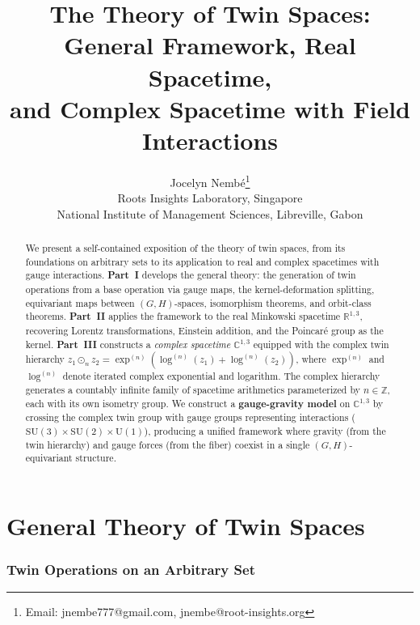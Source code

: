 \documentclass[12pt]{article}
\title{\textbf{The Theory of Twin Spaces:\\General Framework, Real Spacetime,\\and Complex Spacetime with Field Interactions}}
\author{Jocelyn Nemb\'e\thanks{Email: jnembe777@gmail.com, jnembe@root-insights.org}\\[0.3em]
\small Roots Insights Laboratory, Singapore\\
\small National Institute of Management Sciences, Libreville, Gabon}
\date{}
\theoremstyle{plain}
\theoremstyle{definition}
\theoremstyle{remark}
\newcommand{\SU}{\mathrm{SU}}
\newcommand{\UU}{\mathrm{U}}
\newcommand{\CC}{\mathbb{C}}
\newcommand{\RR}{\mathbb{R}}
\newcommand{\ZZ}{\mathbb{Z}}
\begin{document}
\maketitle

\begin{abstract}
We present a self-contained exposition of the theory of twin spaces, from its foundations on arbitrary sets to its application to real and complex spacetimes with gauge interactions. \textbf{Part~I} develops the general theory: the generation of twin operations from a base operation via gauge maps, the kernel-deformation splitting, equivariant maps between $(G,H)$-spaces, isomorphism theorems, and orbit-class theorems. \textbf{Part~II} applies the framework to the real Minkowski spacetime $\RR^{1,3}$, recovering Lorentz transformations, Einstein addition, and the Poincar\'e group as the kernel. \textbf{Part~III} constructs a \emph{complex spacetime} $\CC^{1,3}$ equipped with the complex twin hierarchy $z_1 \odot_n z_2 = \exp^{(n)}(\log^{(n)}(z_1) + \log^{(n)}(z_2))$, where $\exp^{(n)}$ and $\log^{(n)}$ denote iterated complex exponential and logarithm. The complex hierarchy generates a countably infinite family of spacetime arithmetics parameterized by $n \in \ZZ$, each with its own isometry group. We construct a \textbf{gauge-gravity model} on $\CC^{1,3}$ by crossing the complex twin group with gauge groups representing interactions ($\SU(3) \times \SU(2) \times \UU(1)$), producing a unified framework where gravity (from the twin hierarchy) and gauge forces (from the fiber) coexist in a single $(G,H)$-equivariant structure.
\end{abstract}

\tableofcontents
\newpage



\part{General Theory of Twin Spaces}

\section{Twin Operations on an Arbitrary Set}
\label{sec:generation}
\end{document}
